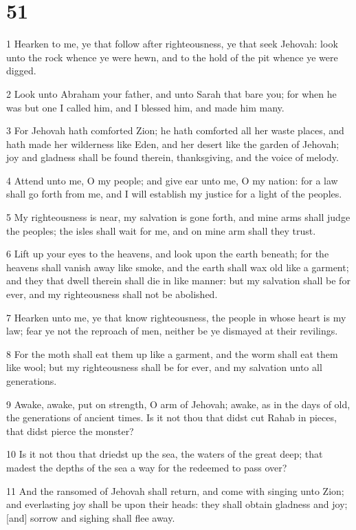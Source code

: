 \chapter{51}

\par 1 Hearken to me, ye that follow after righteousness, ye that seek Jehovah: look unto the rock whence ye were hewn, and to the hold of the pit whence ye were digged.
\par 2 Look unto Abraham your father, and unto Sarah that bare you; for when he was but one I called him, and I blessed him, and made him many.
\par 3 For Jehovah hath comforted Zion; he hath comforted all her waste places, and hath made her wilderness like Eden, and her desert like the garden of Jehovah; joy and gladness shall be found therein, thanksgiving, and the voice of melody.
\par 4 Attend unto me, O my people; and give ear unto me, O my nation: for a law shall go forth from me, and I will establish my justice for a light of the peoples.
\par 5 My righteousness is near, my salvation is gone forth, and mine arms shall judge the peoples; the isles shall wait for me, and on mine arm shall they trust.
\par 6 Lift up your eyes to the heavens, and look upon the earth beneath; for the heavens shall vanish away like smoke, and the earth shall wax old like a garment; and they that dwell therein shall die in like manner: but my salvation shall be for ever, and my righteousness shall not be abolished.
\par 7 Hearken unto me, ye that know righteousness, the people in whose heart is my law; fear ye not the reproach of men, neither be ye dismayed at their revilings.
\par 8 For the moth shall eat them up like a garment, and the worm shall eat them like wool; but my righteousness shall be for ever, and my salvation unto all generations.
\par 9 Awake, awake, put on strength, O arm of Jehovah; awake, as in the days of old, the generations of ancient times. Is it not thou that didst cut Rahab in pieces, that didst pierce the monster?
\par 10 Is it not thou that driedst up the sea, the waters of the great deep; that madest the depths of the sea a way for the redeemed to pass over?
\par 11 And the ransomed of Jehovah shall return, and come with singing unto Zion; and everlasting joy shall be upon their heads: they shall obtain gladness and joy; [and] sorrow and sighing shall flee away.
